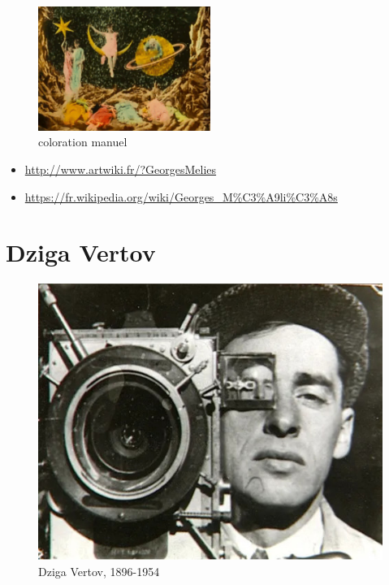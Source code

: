 \documentclass[
]{book}
\providecommand{\tightlist}{%
  \setlength{\itemsep}{0pt}\setlength{\parskip}{0pt}}
\begin{document}
\begin{figure}
\centering
\includegraphics[width=0.5\textwidth,height=\textheight]{medias/corpus/melies/b25.gif}
\caption{coloration manuel}
\end{figure}

\begin{itemize}
\tightlist
\item
  \url{http://www.artwiki.fr/?GeorgesMelies}
\item
  \url{https://fr.wikipedia.org/wiki/Georges_M\%C3\%A9li\%C3\%A8s}
\end{itemize}

\hypertarget{dziga-vertov}{%
\section{Dziga Vertov}\label{dziga-vertov}}

\begin{figure}
\centering
\includegraphics{medias/corpus/vertov/Dziga-Vertov.jpg}
\caption{Dziga Vertov, 1896-1954}
\end{figure}
\end{document}
